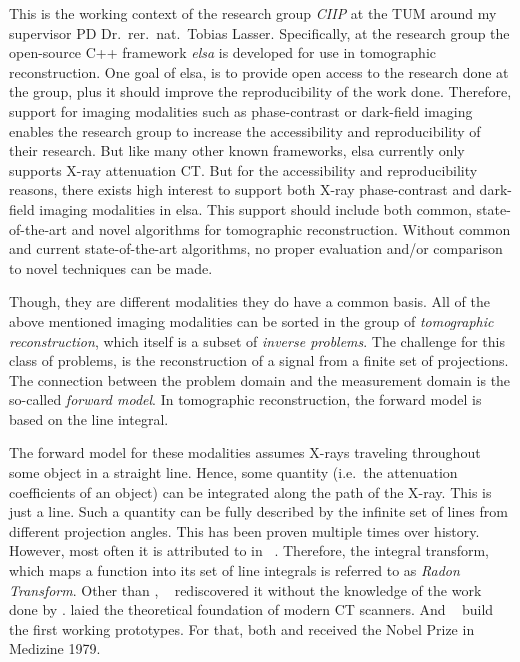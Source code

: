 This is the working context of the research group \textit{\gls{CIIP}} at the \gls{TUM} around my
supervisor PD Dr.\ rer.\ nat.\ Tobias Lasser. Specifically, at the research group the open-source
C++ framework \textit{elsa} is developed for use in tomographic reconstruction. One goal of elsa, is
to provide open access to the research done at the group, plus it should improve the reproducibility
of the work done. Therefore, support for imaging modalities such as phase-contrast or dark-field
imaging enables the research group to increase the accessibility and reproducibility of their
research. But like many other known frameworks, elsa currently only supports X-ray attenuation CT\@.
But for the accessibility and reproducibility reasons, there exists high interest to support both
X-ray phase-contrast and dark-field imaging modalities in elsa. This support should include both
common, state-of-the-art and novel algorithms for tomographic reconstruction. Without common and
current state-of-the-art algorithms, no proper evaluation and/or comparison to novel techniques can
be made.

Though, they are different modalities they do have a common basis. All of the above mentioned
imaging modalities can be sorted in the group of \textit{tomographic reconstruction}, which itself
is a subset of \textit{inverse problems}. The challenge for this class of problems, is the
reconstruction of a signal from a finite set of projections. The connection between the problem
domain and the measurement domain is the so-called \textit{forward model}. In tomographic
reconstruction, the forward model is based on the line integral.

The forward model for these modalities assumes X-rays traveling throughout some object in a straight
line. Hence, some quantity (i.e.\ the attenuation coefficients of an object) can be integrated along
the path of the X-ray. This is just a line. Such a quantity can be fully described by the infinite
set of lines from different projection angles. This has been proven multiple times over history.
However, most often it is attributed to \citeauthor*{radon_uber_1917} in \citeyear{radon_uber_1917}
~\cite{radon_uber_1917}. Therefore, the integral transform, which maps a function into its set of
line integrals is referred to as \textit{Radon Transform}. Other than \citeauthor*{radon_uber_1917},
\citeauthor*{cormack_representation_1963}~\cite{cormack_representation_1963} rediscovered it without
the knowledge of the work done by \citeauthor*{radon_uber_1917}.
\citeauthor*{cormack_representation_1963} laied the theoretical foundation of modern CT scanners.
And \citeauthor*{hounsfield_computerized_1973}~\cite{hounsfield_computerized_1973} build the first
working prototypes. For that, both \citeauthor*{cormack_representation_1963} and
\citeauthor*{hounsfield_computerized_1973} received the Nobel Prize in Medizine 1979.

